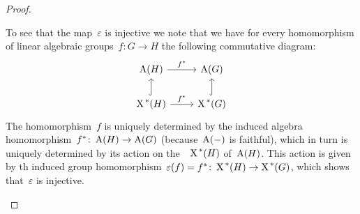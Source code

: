 \begin{proof}
\begin{enumerate}[label = Step~\arabic*]
      To see that the map~$\varepsilon$ is injective we note that we have for every homomorphism of linear algebraic groups~$f \colon G \to H$ the following commutative diagram:
      \[
        \begin{tikzcd}
            \coord(H)
            \arrow{r}[above]{f^*}
          & \coord(G)
          \\
            \chargroup(H)
            \arrow{r}[above]{f^*}
            \arrow[hook]{u}
          & \chargroup(G)
            \arrow[hook]{u}
        \end{tikzcd}
      \]
      The homomorphism~$f$ is uniquely determined by the induced algebra homomorphism~$f^* \colon \operatorname{A}(H) \to \operatorname{A}(G)$ (because~$\operatorname{A}(-)$ is faithful), which in turn is uniquely determined by its action on the~~$\operatorname{X}^{\,*}(H)$ of~$\operatorname{A}(H)$.
      This action is given by th induced group homomorphism~$\varepsilon(f) = f^* \colon \operatorname{X}^{\,*}(H) \to \operatorname{X}^{\,*}(G)$, which shows that~$\varepsilon$ is injective.
      

\end{enumerate}
\end{proof}
